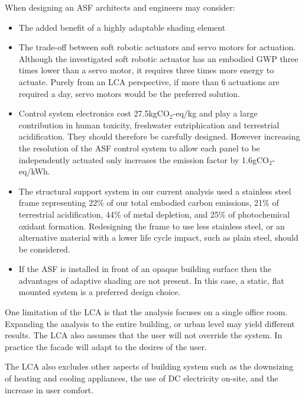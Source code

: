 When designing an ASF architects and engineers may consider: 
\begin{itemize}
\item The added benefit of a highly adaptable shading element
\item The trade-off between soft robotic actuators and servo motors for actuation. Although the investigated soft robotic actuator has an embodied GWP three times lower than a servo motor, it requires three times more energy to actuate. Purely from an LCA perspective, if more than 6 actuations are required a day, servo motors would be the preferred solution. 
\item Control system electronics cost 27.5kgCO$_{2}$-eq/kg and play a large contribution in human toxicity, freshwater eutriphication and terrestrial acidification. They should therefore be carefully designed. However increasing the resolution of the ASF control system to allow each panel to be independently actuated only increases the emission factor by 1.6gCO$_{2}$-eq/kWh.
\item The structural support system in our current analysis used a stainless steel frame representing 22\% of our total embodied carbon emissions, 21\% of terrestrial acidification, 44\% of metal depletion, and 25\% of photochemical oxidant formation. Redesigning the frame to use less stainless steel, or an alternative material with a lower life cycle impact, such as plain steel, should be considered.
\item If the ASF is installed in front of an opaque building surface then the advantages of adaptive shading are not present. In this case, a static, flat mounted system is a preferred design choice. 
\end{itemize}
 
One limitation of the LCA is that the analysis focuses on a single office room. Expanding the analysis to the entire building, or urban level may yield different results. The LCA also assumes that the user will not override the system. In practice the facade will adapt to the desires of the user. 

The LCA also excludes other aspects of building system such as the downsizing of heating and cooling appliances, the use of DC electricity on-site, and the increase in user comfort.

